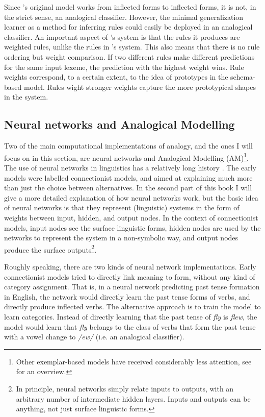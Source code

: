 Since \citet{Albright.2003}'s original model works from inflected forms to inflected forms, it is not, in the strict sense, an analogical classifier. However, the minimal generalization learner as a method for inferring rules could easily be deployed in an analogical classifier. An important aspect of \citet{Albright.2003}'s system is that the rules it produces are weighted rules, unlike the rules in \citet{Viks.1994}'s system. This also means that there is no rule ordering but weight comparison. If two different rules make different predictions for the same input lexeme, the prediction with the highest weight wins. Rule weights correspond, to a certain extent, to the idea of prototypes in the schema-based model. Rules wight stronger weights capture the more prototypical shapes in the system.


\subsection{Neural networks and Analogical Modelling}


Two of the main computational implementations of analogy, and the ones I will focus on in this section, are neural networks and Analogical Modelling (AM)\footnote{Other exemplar-based models have received considerably less attention, see \citet{Matthews.2005} for an overview.}. The use of neural networks in linguistics has a relatively long history \autocites{Bechtel.2002, Churchland.1989, McClelland.1986, Rumelhart.1986, Rumelhart.1986a}. The early models were labelled connectionist models, and aimed at explaining much more than just the choice between alternatives. In the second part of this book I will give a more detailed explanation of how neural networks work, but the basic idea of neural networks is that they represent (linguistic) systems in the form of weights between input, hidden, and output nodes. In the context of connectionist models, input nodes see the surface linguistic forms, hidden nodes are used by the networks to represent the system in a non-symbolic way, and output nodes produce the surface outputs\footnote{In principle, neural networks simply relate inputs to outputs, with an arbitrary number of intermediate hidden layers. Inputs and outputs can be anything, not just surface linguistic forms.}.

Roughly speaking, there are two kinds of neural network implementations. Early connectionist models tried to directly link meaning to form, without any kind of category assignment. That is, in a neural network predicting past tense formation in English, the network would directly learn the past tense forms of verbs, and directly produce inflected verbs.
The alternative approach is to train the model to learn categories. Instead of directly learning that the past tense of \textit{fly} is \textit{flew}, the model would learn that \textit{fly} belongs to the class of verbs that form the past tense with a vowel change to \textit{/ew/} (i.e. an analogical classifier).

